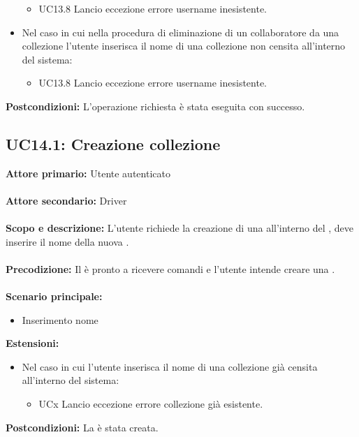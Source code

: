 \documentclass{scalatekids-article}
\begin{document}
\begin{itemize}
  \begin{itemize}
    \item UC13.8 Lancio eccezione errore username inesistente.
  \end{itemize}
  \item Nel caso in cui nella procedura di eliminazione di un collaboratore da una collezione l'utente inserisca il nome di una collezione non censita all'interno del sistema:
  \begin{itemize}
    \item UC13.8 Lancio eccezione errore username inesistente.
  \end{itemize}
\end{itemize}
\textbf{Postcondizioni:} L'operazione richiesta è stata eseguita con successo.

\subsection{UC14.1: Creazione collezione}

\textbf{Attore primario:} Utente autenticato\\ \\
\textbf{Attore secondario:} Driver\\ \\
\textbf{Scopo e descrizione:} L'utente richiede la creazione di una  all'interno del , deve inserire il nome della nuova .\\ \\
\textbf{Precodizione:} Il  è pronto a ricevere comandi e l'utente intende creare una .\\ \\
\textbf{Scenario principale:}
\begin{itemize}
\item Inserimento nome 
\end{itemize}
\textbf{Estensioni:}
\begin{itemize}
\item Nel caso in cui l'utente inserisca il nome di una collezione già censita all'interno del sistema:
  \begin{itemize}
  \item UCx Lancio eccezione errore collezione già esistente.
  \end{itemize}
\end{itemize}
\textbf{Postcondizioni:} La  è stata creata.
\end{document}
